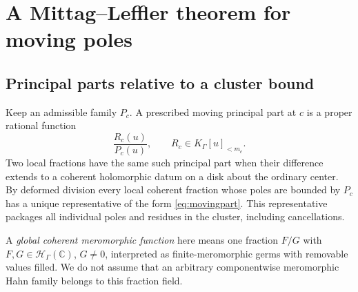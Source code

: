 \documentclass[11pt,letterpaper]{article}
\theoremstyle{definition}
\theoremstyle{remark}
\newcommand{\C}{\mathbb C}
\newcommand{\HH}{\mathscr H_\Gamma}
\newcommand{\KG}{K_\Gamma}
\numberwithin{equation}{section}
\begin{document}
\section{A Mittag--Leffler theorem for moving poles}\label{sec:ML}

\subsection{Principal parts relative to a cluster bound}
Keep an admissible family $P_c$. A prescribed moving principal part at $c$ is a proper rational function
\begin{equation}\label{eq:movingpart}
 \frac{R_c(u)}{P_c(u)},\qquad R_c\in\KG[u]_{<m_c}.
\end{equation}
Two local fractions have the same such principal part when their difference extends to a coherent holomorphic datum on a disk about the ordinary center. By deformed division every local coherent fraction whose poles are bounded by $P_c$ has a unique representative of the form \eqref{eq:movingpart}. This representative packages all individual poles and residues in the cluster, including cancellations.

A \emph{global coherent meromorphic function} here means one fraction $F/G$ with $F,G\in\HH(\C)$, $G\ne0$, interpreted as finite-meromorphic germs with removable values filled. We do not assume that an arbitrary componentwise meromorphic Hahn family belongs to this fraction field.
\end{document}

